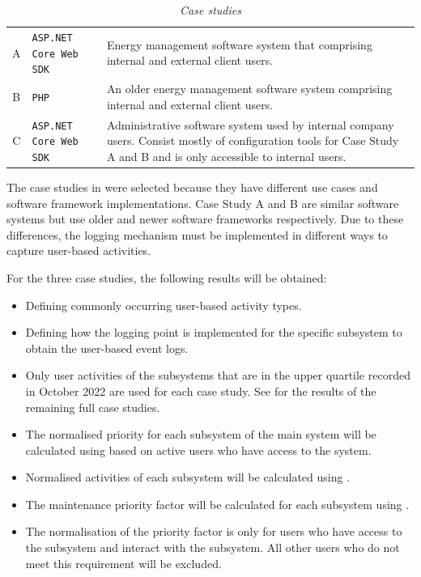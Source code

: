 \begin{table}[!htb]
	\centering
	\caption[Case studies]
	{\textit{Case studies}}
	\label{tbl:ch3_caseStudies}
	\begin{tabularx}{\textwidth}{clX}
		\toprule
		\thead{Case study} & \thead{Software framework} & \thead{Description} \\
		\midrule
		\rowcolor{lightgray}
		A & \texttt{ASP.NET Core Web SDK} & \RaggedRight Energy management software system that comprising internal and external client users. \\
		B & \texttt{PHP} & \RaggedRight An older energy management software system comprising internal and external client users. \\
		\rowcolor{lightgray}
		C & \texttt{ASP.NET Core Web SDK} & \RaggedRight Administrative software system used by internal company users. Consist mostly of configuration tools for Case Study A and B and is only accessible to internal users. \\
		\bottomrule
	\end{tabularx}
\end{table}

The case studies in  were selected because they have different use cases and software framework implementations. Case Study A and B are similar software systems but use older and newer software frameworks respectively. Due to these differences, the logging mechanism must be implemented in different ways to capture user-based activities. \par For the three case studies, the following results will be obtained:

\begin{itemize}
\item Defining commonly occurring user-based activity types.
\item Defining how the logging point is implemented for the specific subsystem to obtain the user-based event logs.
\item Only user activities of the subsystems that are in the upper quartile recorded in October 2022 are used for each case study. See  for the results of the remaining full case studies.
\item The normalised priority for each subsystem of the main system will be calculated using  based on active users who have access to the system.
\item Normalised activities of each subsystem will be calculated using .
\item The maintenance priority factor will be calculated for each subsystem using .
\item The normalisation of the priority factor is only for users who have access to the subsystem and interact with the subsystem. All other users who do not meet this requirement will be excluded.
\end{itemize}

